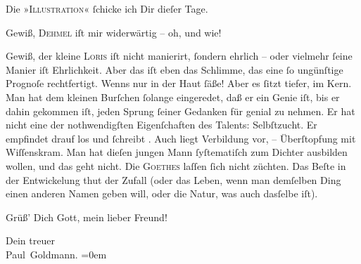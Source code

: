 \pstart
           Die »\textsc{Illustration}« ſchicke ich Dir dieſer Tage.\pend
           
\pstart
           Gewiß, \textsc{Dehmel} iſt mir widerwärtig – oh, und wie!\pend
           
\pstart
           Gewiß, der kleine \textsc{Loris} iſt nicht manierirt, {\pb}ſondern ehrlich – oder
               vielmehr ſeine Manier iſt Ehrlichkeit. Aber das iſt eben das Schlimme, das eine ſo
               ungünſtige  Prognoſe rechtfertigt. \strikeout{\textcolor{gray}{W}} Wenns nur in der Haut ſäße! Aber es ſitzt tiefer, im Kern. Man hat dem kleinen
                  Burſchen ſolange
               eingeredet, daß er ein Genie iſt, bis er dahin gekommen iſt, jeden Sprung ſeiner
               Gedanken für genial zu nehmen. {\pb}Er hat nicht eine
               der nothwendigſten Eigenſchaften des Talents: Selbſtzucht. Er empfindet drauf los und
               ſchreibt \label{K_L02776-5v}\label{K_L02776-5}. Auch
               liegt Verbildung vor, – Überſtopfung mit Wiſſenskram. Man hat dieſen jungen Mann ſyſtematiſch zum Dichter
               ausbilden wollen, und das geht nicht. Die \textsc{Goethes} laſſen ſich nicht züchten. Das
               Beſte in der Entwickelung {\pb}thut der Zufall (oder das
               Leben, wenn man demſelben Ding einen anderen Namen geben will, oder die Natur, was
               auch dasſelbe iſt).\pend
           
\pstart
           Grüß’ Dich Gott, mein lieber Freund!\pend
           
\pstart
           Dein treuer {\\[\baselineskip]}\spacefill\mbox{Paul Goldmann.}\pend
           \leftskip=0em{}\endnumbering{}  
      